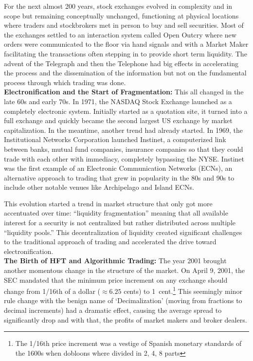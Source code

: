 For the next almost 200 years, stock exchanges evolved in complexity and in scope but remaining conceptually unchanged, functioning at physical locations where traders and stockbrokers met in person to buy and sell securities. Most of the exchanges settled to an interaction system called Open Outcry where new orders were communicated to the floor via hand signals and with a Market Maker facilitating the transactions often stepping in to provide short term liquidity. The advent of the Telegraph and then the Telephone had big effects in accelerating the process and the dissemination of the information but not on the fundamental process through which trading was done. \\


\noindent\textbf{Electronification and the Start of Fragmentation:} This all changed in the late 60s and early 70s. In 1971, the NASDAQ Stock Exchange launched as a completely electronic system. Initially started as a quotation site, it turned into a full exchange and  quickly became the second largest US exchange by market capitalization. In the meantime, another trend had already started. In 1969, the Institutional Networks Corporation launched Instinet, a computerized link between banks, mutual fund companies, insurance companies so that they could trade with each other with immediacy, completely bypassing the NYSE. Instinet was the first example of an Electronic Communication Networks (ECNs), an alternative approach to trading that grew in popularity in the 80s and 90s to include other notable venues like Archipelago and Island ECNs.


This evolution started a trend in market structure that only got more accentuated over time: ``liquidity fragmentation'' meaning that all available interest for a security is not centralized but rather distributed across multiple ``liquidity pools.''  This decentralization of liquidity created significant challenges to the traditional approach of trading and accelerated the drive toward electronification. \\


\noindent\textbf{The Birth of HFT and Algorithmic Trading:} The year 2001 brought another momentous change in the structure of the market. On April 9, 2001, the SEC mandated that the minimum price increment on any exchange should change from 1/16th of a dollar ($\approx6.25$ cents) to 1~cent.\footnote{ The 1/16th price increment was a vestige of Spanish monetary standards of the 1600s when dobloons where divided in 2, 4, 8 parts} This seemingly minor rule change with the benign name of `Decimalization' (moving from fractions to decimal increments) had a dramatic effect, causing the average spread to significantly drop and with that, the profits of market makers and broker dealers.
 
